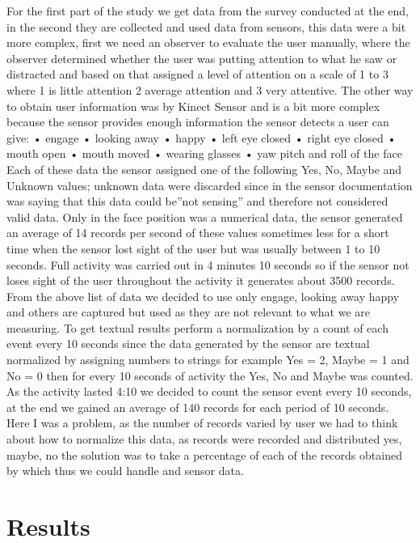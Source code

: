 For the ﬁrst part of the study we get data from the survey conducted at the end, in the second they are collected and used data from sensors, this data were a bit more complex, ﬁrst we need an observer to evaluate the user manually, where the observer determined whether the user was putting attention to what he saw or distracted and based on that assigned a level of attention on a scale of 1 to 3 where 1 is little attention 2 average attention and 3 very attentive. 
The other way to obtain user information was by Kinect Sensor and is a bit more complex because the sensor provides enough information the sensor detects a user can give: 
• engage 
• looking away 
• happy 
• left eye closed 
• right eye closed
• mouth open 
• mouth moved 
• wearing glasses 
• yaw pitch and roll of the face
Each of these data the sensor assigned one of the following Yes, No, Maybe and Unknown values; unknown data were discarded since in the sensor documentation was saying that this data could be”not sensing” and therefore not considered valid data. Only in the face position was a numerical data, the sensor generated an average of 14 records per second of these values sometimes less for a short time when the sensor lost sight of the user but was usually between 1 to 10 seconds.
Full activity was carried out in 4 minutes 10 seconds so if the sensor not loses sight of the user throughout the activity it generates about 3500 records. From the above list of data we decided to use only engage, looking away happy and others are captured but used as they are not relevant to what we are measuring. To get textual results perform a normalization by a count of each event every 10 seconds since the data generated by the sensor are textual normalized by assigning numbers to strings for example Yes = 2, Maybe = 1 and No = 0 then for every 10 seconds of activity the Yes, No and Maybe was counted.
As the activity lasted 4:10 we decided to count the sensor event every 10 seconds, at the end we gained an average of 140 records for each period of 10 seconds. Here I was a problem, as the number of records varied by user we had to think about how to normalize this data, as records were recorded and distributed yes, maybe, no the solution was to take a percentage of each of the records obtained by which thus we could handle and sensor data.
\section{Results}